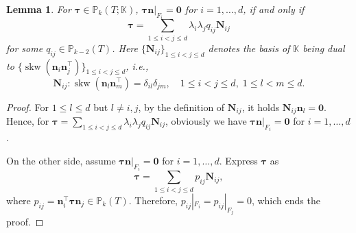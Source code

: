 \documentclass[10pt]{amsart}
\newtheorem{lemma}[theorem]{Lemma}
\newcommand{\skw}{\operatorname{skw}}
\numberwithin{equation}{section}
\begin{document}
\begin{lemma}\label{lem:PkKbubblecharac}
For $\boldsymbol{\tau}\in\mathbb P_k(T;\mathbb K)$, $\boldsymbol{\tau}\boldsymbol{n}|_{F_i}=\boldsymbol{0}$ for $i=1,\ldots, d$, if and only if 
\begin{equation}\label{eq:PkKbubblecharac}
\boldsymbol{\tau}=\sum_{1\leq i<j\leq d}\lambda_i\lambda_jq_{ij}\boldsymbol{N}_{ij}
\end{equation}
for some $q_{ij}\in\mathbb P_{k-2}(T)$. Here $\{\boldsymbol{N}_{ij}\}_{1\leq i<j\leq d}$ denotes the basis of $\mathbb K$ being dual to $\{\skw({\boldsymbol n_i\boldsymbol n_j^{\intercal}})\}_{1\leq i<j\leq d}$, i.e.,
\[
\boldsymbol{N}_{ij}:\skw({\boldsymbol n_l\boldsymbol n_m^{\intercal}})=\delta_{il}\delta_{jm},\quad 1\leq i<j\leq d,\; 1\leq l<m\leq d.
\]
\end{lemma}
\begin{proof}
For $1\leq l\leq d$ but $l\neq i, j$, by the definition of $\boldsymbol{N}_{ij}$, it holds $\boldsymbol{N}_{ij}\boldsymbol{n}_l=\boldsymbol{0}$. Hence, for $
\boldsymbol{\tau}=\sum\limits_{1\leq i<j\leq d}\lambda_i\lambda_jq_{ij}\boldsymbol{N}_{ij}
$, obviously we have $\boldsymbol{\tau}\boldsymbol{n}|_{F_i}=\boldsymbol{0}$ for $i=1,\ldots, d$.

On the other side, assume $\boldsymbol{\tau}\boldsymbol{n}|_{F_i}=\boldsymbol{0}$ for $i=1,\ldots, d$. Express $\boldsymbol{\tau}$ as 
\[
\boldsymbol{\tau}=\sum_{1\leq i<j\leq d}p_{ij}\boldsymbol{N}_{ij},
\]
where $p_{ij}=\boldsymbol{n}_i^{\intercal}\boldsymbol{\tau}\boldsymbol{n}_j\in\mathbb P_{k}(T)$.
Therefore, $p_{ij}|_{F_i}=p_{ij}|_{F_j}=0$, which ends the proof.
\end{proof}
\end{document}
